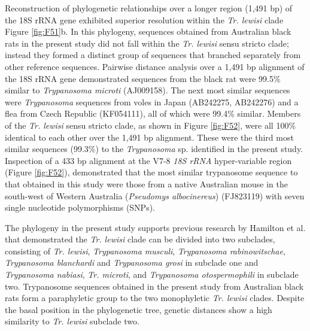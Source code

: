 \documentclass[a4paper, nobind]{templates/ociamthesis}
\begin{document}
Reconstruction of phylogenetic relationships over a longer region (1,491 bp) of the 18S rRNA gene exhibited superior resolution within the \emph{Tr. lewisi} clade Figure \ref{fig:F51}b. In this phylogeny, sequences obtained from Australian black rats in the present study did not fall within the \emph{Tr. lewisi} sensu stricto clade; instead they formed a distinct group of sequences that branched separately from other reference sequences. Pairwise distance analysis over a 1,491 bp alignment of the 18S rRNA gene demonstrated sequences from the black rat were 99.5\% similar to \emph{Trypanosoma microti} (AJ009158). The next most similar sequences were \emph{Trypanosoma} sequences from voles in Japan (AB242275, AB242276) and a flea from Czech Republic (KF054111), all of which were 99.4\% similar. Members of the \emph{Tr. lewisi} sensu stricto clade, as shown in Figure \ref{fig:F52}, were all 100\% identical to each other over the 1,491 bp alignment. These were the third most similar sequences (99.3\%) to the \emph{Trypanosoma} sp. identified in the present study. Inspection of a 433 bp alignment at the V7-8 \emph{18S rRNA} hyper-variable region (Figure \ref{fig:F52}), demonstrated that the most similar trypanosome sequence to that obtained in this study were those from a native Australian mouse in the south-west of Western Australia (\emph{Pseudomys albocinereus}) (FJ823119) with seven single nucleotide polymorphisms (SNPs).

The phylogeny in the present study supports previous research by Hamilton et al. \autocite*{hamiltonInadvertentIntroductionAustralia2005} that demonstrated the \emph{Tr. lewisi} clade can be divided into two subclades, consisting of \emph{Tr. lewisi}, \emph{Trypanosoma musculi}, \emph{Trypanosoma rabinowitschae}, \emph{Trypanosoma blanchardi} and \emph{Trypanosoma grosi} in subclade one and \emph{Trypanosoma nabiasi}, \emph{Tr. microti}, and \emph{Trypanosoma otospermophili} in subclade two. Trypanosome sequences obtained in the present study from Australian black rats form a paraphyletic group to the two monophyletic \emph{Tr. lewisi} clades. Despite the basal position in the phylogenetic tree, genetic distances show a high similarity to \emph{Tr. lewisi} subclade two.
\end{document}
